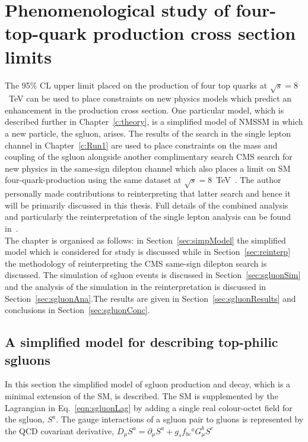 \chapter{Phenomenological study of \runone four-top-quark production cross section limits}
\label{c:pheno}

The 95\% CL upper limit placed on the production of four top quarks at $\sqrt{s}=8$~TeV can be used to place constraints on new physics models which predict an enhancement in the \tttt production cross section. One particular model, which is described further in Chapter~\ref{c:theory}, is a simplified model of NMSSM in which a new particle, the sgluon, arises. The results of the search in the single lepton channel in Chapter~\ref{c:Run1} are used to place constraints on the mass and coupling of the sgluon alongside another complimentary search CMS search for new physics in the same-sign dilepton channel which also places a limit on SM four-quark-production using the same dataset at $\sqrt{s}=8$~TeV~\cite{Chatrchyan:2013fea}. The author personally made contributions to reinterpreting that latter search and hence it will be primarily discussed in this thesis. Full details of the combined analysis and particularly the reinterpretation of the single lepton analysis can be found in~\cite{Beck201548}.\\
The chapter is organised as follows: in Section~\ref{sec:simpModel} the simplified model which is considered for study is discussed while in Section~\ref{sec:reinterp} the methodology of reinterpreting the CMS same-sign dilepton search is discussed. The simulation of sgluon events is discussed in Section~\ref{sec:sgluonSim} and the analysis of the simulation in the reinterpretation is discussed in Section~\ref{sec:sgluonAna}.The results are given in Section~\ref{sec:sgluonResults} and conclusions in Section~\ref{sec:sgluonConc}.

\section{A simplified model for describing top-philic sgluons \label{sec:simpModel} }
In this section the simplified model of sgluon production and decay, which is a minimal extension of the SM, is described. The SM is supplemented by the Lagrangian in Eq.~\ref{eqn:sgluonLag} by adding a single real colour-octet field for the sgluon, $S^{a}$. The gauge interactions of a sgluon pair to gluons is represented by the QCD covariant derivative, $D_{\mu}S^a= \partial_{\mu} S^a + g_s f_{bc}{}^a G_\mu^b S^c$

